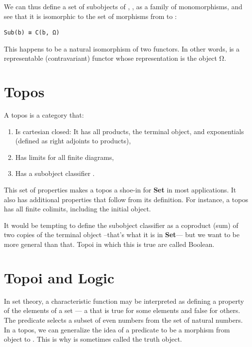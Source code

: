 We can thus define a set of subobjects of , ,
as a family of monomorphisms, and see that it is isomorphic to the set
of morphisms from  to :

\begin{Verbatim}[commandchars=\\\{\}]
Sub(b) ≅ C(b, Ω)
\end{Verbatim}

This happens to be a natural isomorphism of two functors. In other
words,  is a representable (contravariant) functor whose
representation is the object Ω.

\section{Topos}\label{topos}

A topos is a category that:

\begin{enumerate}
\tightlist
\item
  Is cartesian closed: It has all products, the terminal object, and
  exponentials (defined as right adjoints to products),
\item
  Has limits for all finite diagrams,
\item
  Has a subobject classifier .
\end{enumerate}

This set of properties makes a topos a shoe-in for \textbf{Set} in most
applications. It also has additional properties that follow from its
definition. For instance, a topos has all finite colimits, including the
initial object.

It would be tempting to define the subobject classifier as a coproduct
(sum) of two copies of the terminal object --that's what it is in
\textbf{Set}--- but we want to be more general than that. Topoi in which
this is true are called Boolean.

\section{Topoi and Logic}\label{topoi-and-logic}

In set theory, a characteristic function may be interpreted as defining
a property of the elements of a set --- a  that is true
for some elements and false for others. The predicate 
selects a subset of even numbers from the set of natural numbers. In a
topos, we can generalize the idea of a predicate to be a morphism from
object  to . This is why  is sometimes
called the truth object.


